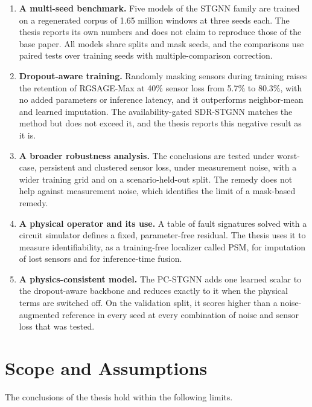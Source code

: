 \documentclass[MTech]{ugthesis}
\begin{document}
\begin{enumerate}
\item \textbf{A multi-seed benchmark.} Five models of the \ac{STGNN} family are trained on a regenerated corpus of 1.65 million windows at three seeds each. The thesis reports its own numbers and does not claim to reproduce those of the base paper. All models share splits and mask seeds, and the comparisons use paired tests over training seeds with multiple-comparison correction.
\item \textbf{Dropout-aware training.} Randomly masking sensors during training raises the retention of RGSAGE-Max at 40\% sensor loss from 5.7\% to 80.3\%, with no added parameters or inference latency, and it outperforms neighbor-mean and learned imputation. The availability-gated \ac{SDR-STGNN} matches the method but does not exceed it, and the thesis reports this negative result as it is.
\item \textbf{A broader robustness analysis.} The conclusions are tested under worst-case, persistent and clustered sensor loss, under measurement noise, with a wider training grid and on a scenario-held-out split. The remedy does not help against measurement noise, which identifies the limit of a mask-based remedy.
\item \textbf{A physical operator and its use.} A table of fault signatures solved with a circuit simulator defines a fixed, parameter-free residual. The thesis uses it to measure identifiability, as a training-free localizer called \ac{PSM}, for imputation of lost sensors and for inference-time fusion.
\item \textbf{A physics-consistent model.} The \ac{PC-STGNN} adds one learned scalar to the dropout-aware backbone and reduces exactly to it when the physical terms are switched off. On the validation split, it scores higher than a noise-augmented reference in every seed at every combination of noise and sensor loss that was tested.
\end{enumerate}

\section{Scope and Assumptions}
\label{sec:scope}

The conclusions of the thesis hold within the following limits.
\end{document}

